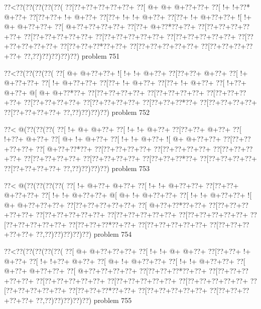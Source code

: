\vbox{\vbox{\goo
\0??<\0??(\0??(\0??(\0??(\0??(
\0??[\0??+\0??+\0??+\0??+\0??+
\0??[\- @+\- @+\- @+\0??+\0??+
\0??[\- !+\- !+\0??*\- @+\0??+
\0??[\0??+\0??+\- !+\- @+\0??+
\0??[\0??+\- !+\- !+\- @+\0??+
\0??[\0??+\- !+\- @+\0??+\0??+
\- ![\- !+\- @+\- @+\0??+\0??+
\0??[\- @+\0??+\0??+\0??+\0??+
\0??[\0??+\- @+\0??*\0??+\0??+
\0??[\0??+\0??+\0??+\0??+\0??+
\0??[\0??+\0??+\0??+\0??+\0??+
\0??[\0??+\0??+\0??+\0??+\0??+
\0??[\0??+\0??+\0??+\0??+\0??+
\0??[\0??+\0??+\0??+\0??+\0??+
\0??[\0??+\0??+\0??*\0??+\0??+
\0??[\0??+\0??+\0??+\0??+\0??+
\0??[\0??+\0??+\0??+\0??+\0??+
\0??,\0??)\0??)\0??)\0??)\0??)
}
\hfil problem 751\hfil\break
}

\vbox{\vbox{\goo
\0??<\0??(\0??(\0??(\0??(
\0??[\- @+\- @+\0??+\0??+
\- ![\- !+\- !+\- @+\0??+
\0??[\0??+\0??+\- @+\0??+
\0??[\- !+\- @+\0??+\0??+
\0??[\- !+\- @+\0??+\0??+
\0??[\0??+\- !+\- @+\0??+
\0??[\0??+\- !+\- @+\0??+
\0??[\- !+\0??+\- @+\0??+
\- @[\- @+\- @+\0??*\0??+
\0??[\0??+\0??+\0??+\0??+
\0??[\0??+\0??+\0??+\0??+
\0??[\0??+\0??+\0??+\0??+
\0??[\0??+\0??+\0??+\0??+
\0??[\0??+\0??+\0??+\0??+
\0??[\0??+\0??+\0??*\0??+
\0??[\0??+\0??+\0??+\0??+
\0??[\0??+\0??+\0??+\0??+
\0??,\0??)\0??)\0??)\0??)
}
\hfil problem 752\hfil\break
}

\vbox{\vbox{\goo
\0??<\- @(\0??(\0??(\0??(
\0??[\- !+\- @+\- @+\0??+
\0??[\- !+\- !+\- @+\0??+
\0??[\0??+\0??+\- @+\0??+
\0??[\- !+\0??+\- @+\0??+
\0??[\- @+\- !+\- @+\0??+
\0??[\- !+\- !+\- @+\0??+
\- ![\- @+\- @+\0??+\0??+
\0??[\0??+\0??+\0??+\0??+
\0??[\- @+\0??+\0??*\0??+
\0??[\0??+\0??+\0??+\0??+
\0??[\0??+\0??+\0??+\0??+
\0??[\0??+\0??+\0??+\0??+
\0??[\0??+\0??+\0??+\0??+
\0??[\0??+\0??+\0??+\0??+
\0??[\0??+\0??+\0??*\0??+
\0??[\0??+\0??+\0??+\0??+
\0??[\0??+\0??+\0??+\0??+
\0??,\0??)\0??)\0??)\0??)
}
\hfil problem 753\hfil\break
}

\vbox{\vbox{\goo
\0??<\- @(\0??(\0??(\0??(\0??(
\0??[\- !+\- @+\0??+\- @+\0??+
\0??[\- !+\- !+\- @+\0??+\0??+
\0??[\0??+\0??+\- @+\0??+\0??+
\0??[\- !+\- !+\- @+\0??+\0??+
\- @[\- @+\- !+\- @+\0??+\0??+
\0??[\- !+\- !+\- @+\0??+\0??+
\- ![\- @+\- @+\0??+\0??+\0??+
\0??[\0??+\0??+\0??+\0??+\0??+
\0??[\- @+\0??+\0??*\0??+\0??+
\0??[\0??+\0??+\0??+\0??+\0??+
\0??[\0??+\0??+\0??+\0??+\0??+
\0??[\0??+\0??+\0??+\0??+\0??+
\0??[\0??+\0??+\0??+\0??+\0??+
\0??[\0??+\0??+\0??+\0??+\0??+
\0??[\0??+\0??+\0??*\0??+\0??+
\0??[\0??+\0??+\0??+\0??+\0??+
\0??[\0??+\0??+\0??+\0??+\0??+
\0??,\0??)\0??)\0??)\0??)\0??)
}
\hfil problem 754\hfil\break
}

\vbox{\vbox{\goo
\0??<\0??(\0??(\0??(\0??(\0??(
\0??[\- @+\- @+\0??+\0??+\0??+
\0??[\- !+\- !+\- @+\- @+\0??+
\0??[\0??+\0??+\- !+\- @+\0??+
\0??[\- !+\- !+\0??+\- @+\0??+
\0??[\- @+\- !+\- @+\0??+\0??+
\0??[\- !+\- !+\- @+\0??+\0??+
\0??[\- @+\0??+\- @+\0??+\0??+
\0??[\- @+\0??+\0??+\0??+\0??+
\0??[\0??+\0??+\0??*\0??+\0??+
\0??[\0??+\0??+\0??+\0??+\0??+
\0??[\0??+\0??+\0??+\0??+\0??+
\0??[\0??+\0??+\0??+\0??+\0??+
\0??[\0??+\0??+\0??+\0??+\0??+
\0??[\0??+\0??+\0??+\0??+\0??+
\0??[\0??+\0??+\0??*\0??+\0??+
\0??[\0??+\0??+\0??+\0??+\0??+
\0??[\0??+\0??+\0??+\0??+\0??+
\0??,\0??)\0??)\0??)\0??)\0??)
}
\hfil problem 755\hfil\break
}

